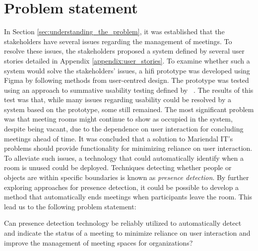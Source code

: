 \section{Problem statement}\label{sec:problem_statement}
In Section \ref{sec:understanding_the_problem}, it was established that the stakeholders have several issues regarding the management of meetings. 
To resolve these issues, the stakeholders proposed a system defined by several user stories detailed in Appendix \ref{appendix:user_stories}. 
To examine whether such a system would solve the stakeholders' issues, a hifi prototype was developed using Figma\cite{Figma} by following methods from user-centred design.
The prototype was tested using an approach to summative usability testing defined by \citeauthor{lazar2005web}~\cite{lazar2005web}. 
The results of this test was that, while many issues regarding usability could be resolved by a system based on the prototype, some still remained. 
The most significant problem was that meeting rooms might continue to show as occupied in the system, despite being vacant, due to the dependence on user interaction for concluding meetings ahead of time.
It was concluded that a solution to Mariendal IT's problems should provide functionality for minimizing reliance on user interaction.
To alleviate such issues, a technology that could automatically identify when a room is unused could be deployed. 
Techniques detecting whether people or objects are within specific boundaries is known as \textit{presence detection}.
By further exploring approaches for presence detection, it could be possible to develop a method that automatically ends meetings when participants leave the room.
This lead us to the following problem statement:
\begin{problem_statement}
    Can presence detection technology be reliably utilized to automatically detect and indicate the status of a meeting to minimize reliance on user interaction and improve the management of meeting spaces for organizations? 
\end{problem_statement}

